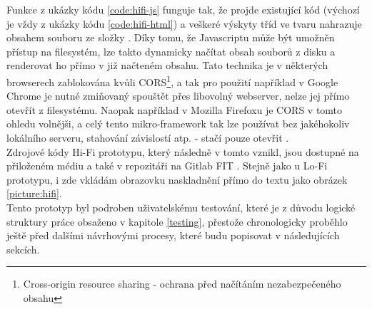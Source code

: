 Funkce  z ukázky kódu \ref{code:hifi-js} funguje tak, že projde existující kód (výchozí je vždy  z ukázky kódu \ref{code:hifi-html}) a veškeré výskyty tříd ve tvaru  nahrazuje obsahem souboru  ze složky . Díky tomu, že Javascriptu může být umožněn přístup na filesystém, lze takto dynamicky načítat obsah souborů z disku a renderovat ho přímo v již načteném obsahu. Tato technika je v některých browserech zablokována kvůli CORS\footnote{Cross-origin resource sharing - ochrana před načítáním nezabezpečeného obsahu}, a tak pro použití například v Google Chrome je nutné zmiňovaný  spouštět přes libovolný webserver, nelze jej přímo otevřít z filesystému. Naopak například v Mozilla Firefoxu je CORS v tomto ohledu volnějši, a celý tento mikro-framework tak lze používat bez jakéhokoliv lokálního serveru, stahování závislostí atp. - stačí pouze otevřit .\\
Zdrojové kódy Hi-Fi prototypu, který následně v tomto  vznikl, jsou dostupné na přiloženém médiu a také v repozitáři na Gitlab FIT \cite{gitlab-hifi}. Stejně jako u Lo-Fi prototypu, i zde vkládám obrazovku naskladnění přímo do textu jako obrázek \ref{picture:hifi}.\\
Tento prototyp byl podroben uživatelskému testování, které je z důvodu logické struktury práce obsaženo v kapitole \ref{testing}, přestože chronologicky proběhlo ještě před dalšími návrhovými procesy, které budu popisovat v následujících sekcích.\\

